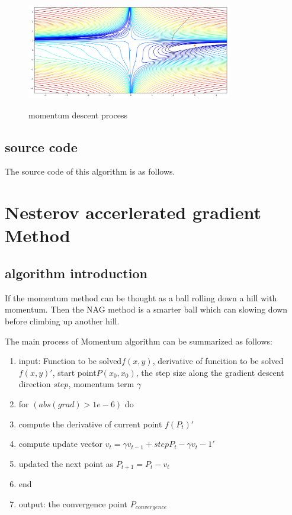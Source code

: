 \documentclass[aps,letterpaper,10pt]{article}
\begin{document}
	\begin{figure}[H]
	  \centering
	  \label{fig:momentum}\includegraphics[width=0.8\textwidth]{momentum.png}\
	  \caption{momentum descent process}
	\end{figure}

\subsection{source code}
The source code of this algorithm is as follows.  \vspace{5mm}
	
	\vspace{3mm}


\newpage
\section{Nesterov accerlerated gradient Method}
\subsection{algorithm introduction}
  If the momentum method can be thought as a ball rolling down a hill with momentum. Then the NAG method is a smarter ball which can slowing down before climbing up another hill.\vspace{3mm}

  The main process of Momentum algorithm can be summarized as follows:
\begin{enumerate}
	\item input: Function to be solved$f(x,y)$, derivative of funcition to be solved${f(x,y)}'$, start point$P(x_0,x_0)$, the step size along the gradient descent direction $step$, momentum term $\gamma$
	\item for $(abs(grad)> 1e-6)$ do
	\item compute the derivative of current point ${f(P_t)}'$
  \item compute update vector $v_t=\gamma v_{t-1} + step{P_t-\gamma v_t-1}'$
	\item updated the next point as $P_{t+1}=P_t - v_t$
  \item end
	\item output: the convergence point $P_{convergence}$
\end{enumerate}
\end{document}
